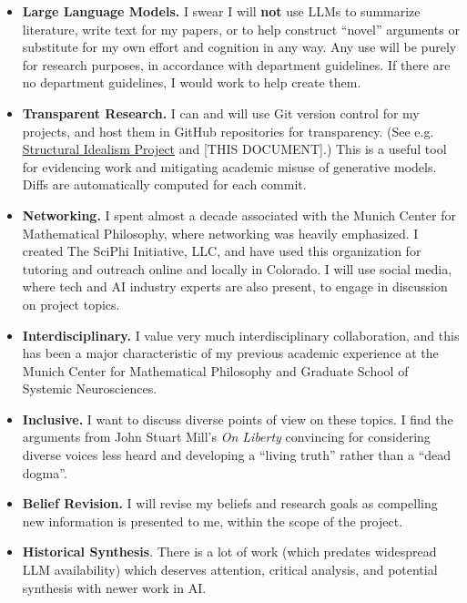 \documentclass[11pt, oneside]{article}   	%
\begin{document}
\begin{itemize}
    \item \textbf{Large Language Models.}  I swear I will \textbf{not} use LLMs to summarize literature, write text for my papers, or to help construct ``novel'' arguments or substitute for my own effort and cognition in any way. Any use will be purely for research purposes, in accordance with department guidelines.  If there are no department guidelines, I would work to help create them. 
    \item \textbf{Transparent Research.}  I can and will use Git version control for my projects, and host them in GitHub repositories for transparency.  (See e.g. \href{https://github.com/CameronBeebe/Structural_Idealism}{Structural Idealism Project} and [THIS DOCUMENT].)  This is a useful tool for evidencing work and mitigating academic misuse of generative models.  Diffs are automatically computed for each commit.
    \item \textbf{Networking.} I spent almost a decade associated with the Munich Center for Mathematical Philosophy, where networking was heavily emphasized.  I created The SciPhi Initiative, LLC, and have used this organization for tutoring and outreach online and locally in Colorado.  I will use social media, where tech and AI industry experts are also present, to engage in discussion on project topics.
    \item \textbf{Interdisciplinary.}  I value very much interdisciplinary collaboration, and this has been a major characteristic of my previous academic experience at the Munich Center for Mathematical Philosophy and Graduate School of Systemic Neurosciences.
    \item \textbf{Inclusive.}  I want to discuss diverse points of view on these topics.  I find the arguments from John Stuart Mill's \emph{On Liberty} \citep{OnLiberty1859} convincing for considering diverse voices less heard and developing a ``living truth'' rather than a ``dead dogma''.
    \item \textbf{Belief Revision.}  I will revise my beliefs and research goals as compelling new information is presented to me, within the scope of the project.
    \item \textbf{Historical Synthesis}.  There is a lot of work (which predates widespread LLM availability) which deserves attention, critical analysis, and potential synthesis with newer work in AI.
    
\end{itemize}
\end{document}
